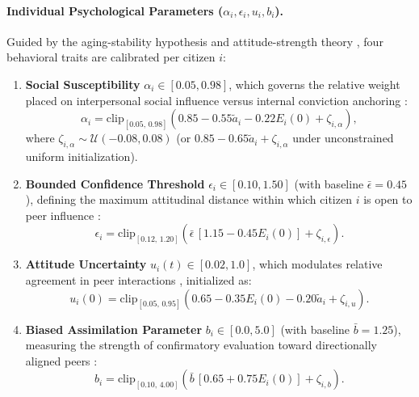 \paragraph{Individual Psychological Parameters ($\alpha_i, \epsilon_i, u_i, b_i$).}
Guided by the aging-stability hypothesis \citep{alwin1991aging, kiley2020measuring} and attitude-strength theory \citep{sherif1961social, howe2017attitude}, four behavioral traits are calibrated per citizen $i$:
\begin{enumerate}
    \item \textbf{Social Susceptibility} $\alpha_i \in [0.05, 0.98]$, which governs the relative weight placed on interpersonal social influence versus internal conviction anchoring \citep{friedkin1990social}:
    \begin{equation}
        \alpha_i = \mathrm{clip}_{[0.05,\, 0.98]}\!\left(0.85 - 0.55\tilde{a}_i - 0.22 E_i(0) + \zeta_{i,\alpha}\right),
        \label{eq:susceptibility}
    \end{equation}
    where $\zeta_{i,\alpha} \sim \mathcal{U}(-0.08, 0.08)$ (or $0.85 - 0.65\tilde{a}_i + \zeta_{i,\alpha}$ under unconstrained uniform initialization).
    \item \textbf{Bounded Confidence Threshold} $\epsilon_i \in [0.10, 1.50]$ (with baseline $\bar{\epsilon} = 0.45$), defining the maximum attitudinal distance within which citizen $i$ is open to peer influence \citep{deffuant2000mixing, hegselmann2002opinion}:
    \begin{equation}
        \epsilon_i = \mathrm{clip}_{[0.12,\, 1.20]}\!\left(\bar{\epsilon}\,[1.15 - 0.45 E_i(0)] + \zeta_{i,\epsilon}\right).
        \label{eq:bounded_confidence}
    \end{equation}
    \item \textbf{Attitude Uncertainty} $u_i(t) \in [0.02, 1.0]$, which modulates relative agreement in peer interactions \citep{deffuant2002how}, initialized as:
    \begin{equation}
        u_i(0) = \mathrm{clip}_{[0.05,\, 0.95]}\!\left(0.65 - 0.35 E_i(0) - 0.20\tilde{a}_i + \zeta_{i,u}\right).
        \label{eq:initial_uncertainty}
    \end{equation}
    \item \textbf{Biased Assimilation Parameter} $b_i \in [0.0, 5.0]$ (with baseline $\bar{b} = 1.25$), measuring the strength of confirmatory evaluation toward directionally aligned peers \citep{lord1979biased, dandekar2013biased}:
    \begin{equation}
        b_i = \mathrm{clip}_{[0.10,\, 4.00]}\!\left(\bar{b}\,[0.65 + 0.75 E_i(0)] + \zeta_{i,b}\right).
        \label{eq:assimilation_bias}
    \end{equation}
\end{enumerate}

